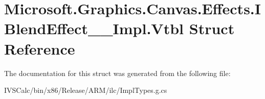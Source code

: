 \hypertarget{struct_microsoft_1_1_graphics_1_1_canvas_1_1_effects_1_1_i_blend_effect_____impl_1_1_vtbl}{}\section{Microsoft.\+Graphics.\+Canvas.\+Effects.\+I\+Blend\+Effect\+\_\+\+\_\+\+Impl.\+Vtbl Struct Reference}
\label{struct_microsoft_1_1_graphics_1_1_canvas_1_1_effects_1_1_i_blend_effect_____impl_1_1_vtbl}


The documentation for this struct was generated from the following file\+:\begin{DoxyCompactItemize}
\item 
I\+V\+S\+Calc/bin/x86/\+Release/\+A\+R\+M/ilc/Impl\+Types.\+g.\+cs\end{DoxyCompactItemize}
